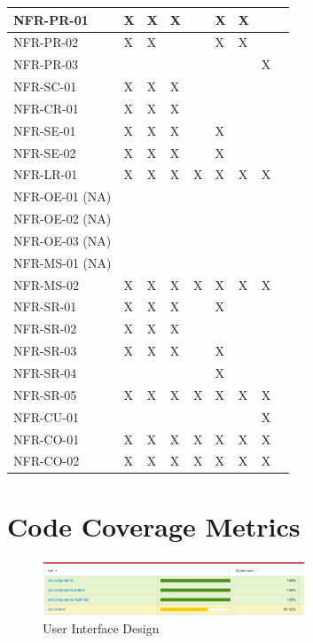 \documentclass[12pt, titlepage]{article}
\begin{document}
\begin{longtable}{|p{3.5cm}|p{1cm}|p{1cm}|p{1cm}|p{1cm}|p{1cm}|p{1cm}|p{1cm}|p{1cm}}
    NFR-PR-01  & X & X & X &  & X & X &  \\\hline
    NFR-PR-02  & X & X &  &  & X & X &  \\\hline
    NFR-PR-03  &  &  &  &  &  &  & X \\\hline
    NFR-SC-01  & X & X & X &  &  &  &  \\\hline
    NFR-CR-01  & X & X & X &  &  &  &  \\\hline
    NFR-SE-01  & X & X & X &  & X &  &  \\\hline
    NFR-SE-02  & X & X & X &  & X &  &  \\\hline
    NFR-LR-01  & X & X & X & X & X & X & X \\\hline
    NFR-OE-01 (NA) &  &  &  &  &  &  &  \\\hline
    NFR-OE-02  (NA) &  &  &  &  &  &  &  \\\hline
    NFR-OE-03  (NA) &  &  &  &  &  &  &  \\\hline
    NFR-MS-01 (NA) &  &  &  &  &  &  &  \\\hline
    NFR-MS-02  & X & X & X & X & X & X & X \\\hline
    NFR-SR-01  & X & X & X &  & X &  &  \\\hline
    NFR-SR-02  & X & X & X &  &  &  &  \\\hline
    NFR-SR-03  & X & X & X &  & X &  &  \\\hline
    NFR-SR-04  &  &  &  &  & X &  &  \\\hline
    NFR-SR-05  & X & X & X & X & X & X & X \\\hline
    NFR-CU-01  &  &  &  &  &  &  & X \\\hline
    NFR-CO-01  & X & X & X & X & X & X & X \\\hline
    NFR-CO-02  & X & X & X & X & X & X & X \\\hline
    
    \hline
\end{longtable}

\section{Code Coverage Metrics}

\begin{figure}[H]
  \centering
  \includegraphics[width=0.7\textwidth]{cc.jpg}
  \caption{User Interface Design}
  \label{FigUH}
  \end{figure}
\end{document}
